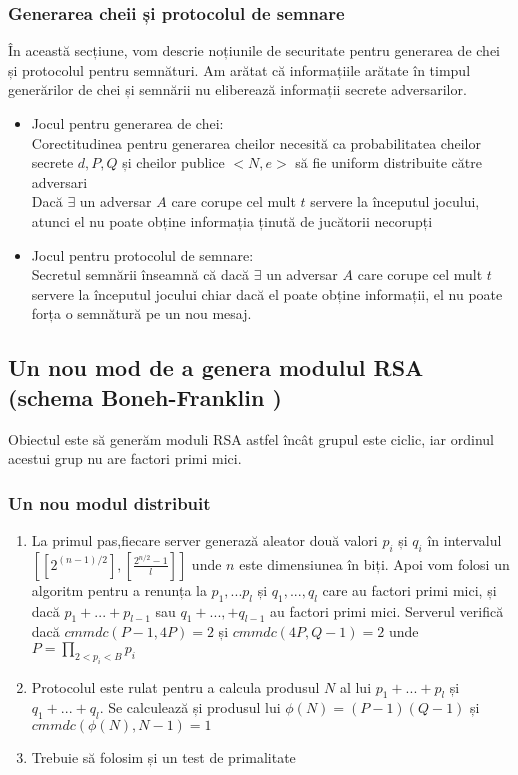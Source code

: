 \documentclass[12]{article}
\begin{document}
\subsubsection{Generarea cheii și protocolul de semnare}
În această secțiune, vom descrie noțiunile de securitate pentru generarea de chei și protocolul pentru semnături. Am arătat că informațiile arătate în timpul generărilor de chei și semnării nu eliberează informații secrete adversarilor.
\begin{itemize}
\item Jocul pentru generarea de chei: \\
Corectitudinea pentru generarea cheilor necesită ca probabilitatea cheilor secrete $d, P, Q$ și cheilor publice $<N,e>$ să fie uniform distribuite către adversari \\ 
Dacă $\exists$ un adversar $A$ care corupe cel mult $t$ servere la începutul jocului, atunci el nu poate obține informația ținută de jucătorii necorupți

\item Jocul pentru protocolul de semnare: \\
Secretul semnării înseamnă că dacă $\exists$ un adversar $A$ care corupe cel mult $t$ servere la începutul jocului chiar dacă el poate obține informații, el nu poate forța o semnătură pe un nou mesaj.
\end{itemize}


\subsection{Un nou mod de a genera modulul RSA (schema Boneh-Franklin \cite{boneh})}
Obiectul este să generăm moduli RSA astfel încât grupul este ciclic, iar ordinul acestui grup nu are factori primi mici.
\subsubsection{Un nou modul distribuit}
\begin{enumerate}

\item La primul pas,fiecare server generază aleator două valori $p_i$ și $q_i$ în intervalul $ \left[ [2^{(n-1)/2}], [\frac{2^{n/2}-1}{l}] \right]$ unde $n$ este dimensiunea în biți. Apoi vom folosi un algoritm pentru a renunța la $p_1,...p_l$ și $q_1,...,q_l$ care au factori primi mici, și dacă $p_1+...+p_{l-1}$ sau $q_1+...,+q_{l-1}$ au factori primi mici. Serverul verifică dacă $cmmdc(P-1,4P)=2$ și $cmmdc(4P,Q-1)=2$ unde $P = \prod_{2 <p_i < B} p_i$

\item Protocolul este rulat pentru a calcula produsul $N$ al lui $p_1+...+p_l$ și $q_1+...+q_l$. Se calculează și produsul lui $\phi(N)=(P-1)(Q-1)$ și $cmmdc(\phi(N),N-1)=1$

\item Trebuie să folosim și un test de primalitate
\end{enumerate}
\end{document}
